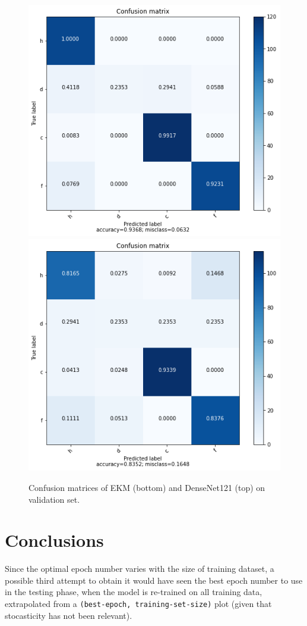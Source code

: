 \documentclass[aps,twocolumn,secnumarabic,nobalancelastpage,amsmath,amssymb,
nofootinbib]{revtex4}
\begin{document}
\begin{figure}[h]
	\centering
	\includegraphics[width=0.7\linewidth]{Images/ConfusionMatrixDenseNet121}
	\includegraphics[width=0.7\linewidth]{Images/ConfusionMatrixEKM}
	\caption{Confusion matrices of EKM (bottom) and DenseNet121 (top) on validation set.}
	\label{fig:confusionmatrixdensenet121}
\end{figure}


\section{Conclusions}\label{conclusions}

Since the optimal epoch number varies with the size of training dataset,
a possible third attempt to obtain it would have seen the best epoch
number to use in the testing phase, when the model is re-trained on all
training data, extrapolated from a
\texttt{(best-epoch,\ training-set-size)} plot (given that stocasticity
has not been relevant). \newline
\end{document}
